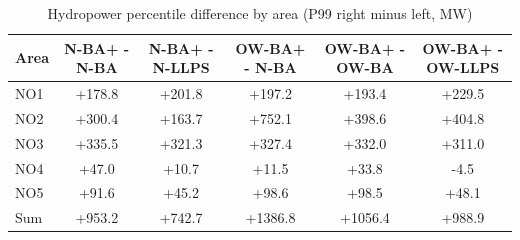 \begin{table}[htbp]
\centering
\caption{Hydropower percentile difference by area (P99 right minus left, MW)}
\label{tab:hydro_p99_diff_area_pairs}
\begin{tabular}{lccccc}
\hline
Area & N-BA+ - N-BA & N-BA+ - N-LLPS & OW-BA+ - N-BA & OW-BA+ - OW-BA & OW-BA+ - OW-LLPS \\
\hline
NO1 & +178.8 & +201.8 & +197.2 & +193.4 & +229.5 \\
NO2 & +300.4 & +163.7 & +752.1 & +398.6 & +404.8 \\
NO3 & +335.5 & +321.3 & +327.4 & +332.0 & +311.0 \\
NO4 & +47.0 & +10.7 & +11.5 & +33.8 & -4.5 \\
NO5 & +91.6 & +45.2 & +98.6 & +98.5 & +48.1 \\
\hline
Sum & +953.2 & +742.7 & +1386.8 & +1056.4 & +988.9 \\
\hline
\end{tabular}
\end{table}